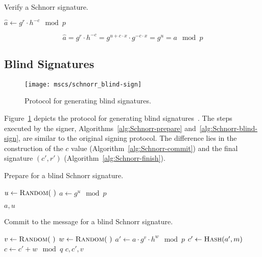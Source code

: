 \begin{algorithm}
  \caption{Verify a Schnorr signature.}
  \label{alg:Schnorr-verify}
  \addtolength{\baselineskip}{1mm}
  \begin{algorithmic}[1]
      \State $\hat{a} \gets g^r \cdot h^{-c} \mod p$

        \Return {}
      \EndIf

      \Return {}
    \EndFunction
  \end{algorithmic}
\end{algorithm}

\begin{equation*}
  \hat{a} = g^r \cdot h^{-c} = g^{u + c \cdot x} \cdot g^{-c \cdot x} = g^u = a \mod p
\end{equation*}

\subsection{Blind Signatures}

\begin{figure}[ht]
  \centering
  \texttt{[image: mscs/schnorr\_blind-sign]}
  \caption{Protocol for generating blind signatures.}
  \label{msc:schnorr_blind-sign}
\end{figure}

Figure~\ref{msc:schnorr_blind-sign} depicts the protocol for generating blind
signatures~\cite{PointchevalStern1996}. The steps executed by the signer,
Algorithms~\ref{alg:Schnorr-prepare} and~\ref{alg:Schnorr-blind-sign}, are
similar to the original signing protocol. The difference lies in the
construction of the $c$ value (Algorithm~\ref{alg:Schnorr-commit}) and the final
signature $(c', r')$ (Algorithm~\ref{alg:Schnorr-finish}).

\begin{algorithm}
  \caption{Prepare for a blind Schnorr signature.}
  \label{alg:Schnorr-prepare}
  \addtolength{\baselineskip}{1mm}
  \begin{algorithmic}[1]
      \State $u \gets \Call{Random}{~}$
      \State $a \gets g^u \mod p$

      \Return $a, u$
    \EndFunction
  \end{algorithmic}
\end{algorithm}

\begin{algorithm}
  \caption{Commit to the message for a blind Schnorr signature.}
  \label{alg:Schnorr-commit}
  \addtolength{\baselineskip}{1mm}
  \begin{algorithmic}[1]
      \State $v \gets \Call{Random}{~}$
      \State $w \gets \Call{Random}{~}$
      \State $a' \gets a \cdot g^v \cdot h^w \mod p$
      \State $c' \gets \Call{Hash}{a', m}$
      \State $c \gets c' + w \mod q$
      \Return $c, c', v$
    \EndFunction
  \end{algorithmic}
\end{algorithm}

